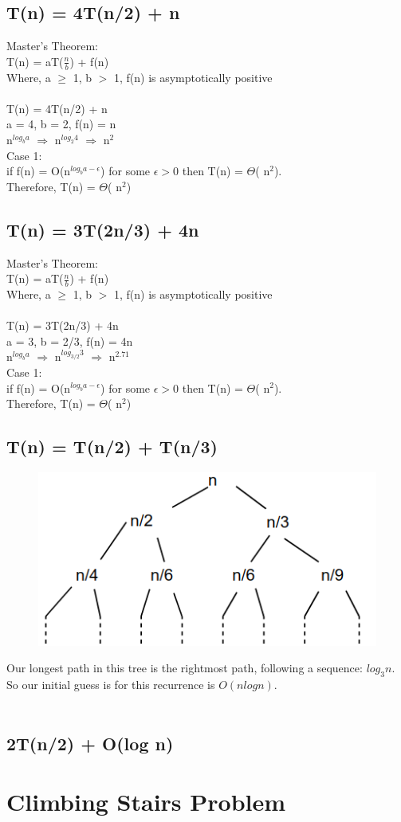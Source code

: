 \documentclass[10pt,letterpaper]{article}
\begin{document}
\subsection{T(n) = 4T(n/2) + n}
Master's Theorem:\\
T(n) = aT($\frac{n}{b}$) + f(n)\\
Where, a $\geq$ 1, b $>$ 1, f(n) is asymptotically positive\\
\\
T(n) = 4T(n/2) + n\\
a = 4, b = 2, f(n) = n\\
n$^{log_{b}a}$ $\Rightarrow$ n$^{log_{2}4}$ $\Rightarrow$ n$^{2}$\\
Case 1:\\
if f(n) = O(n$^{log_{b}a - \epsilon}$) for some $\epsilon > 0$ then T(n) = $\Theta$( n$^{2}$).\\
Therefore, T(n) =  $\Theta$( n$^{2}$)

\subsection{T(n) = 3T(2n/3) + 4n}
Master's Theorem:\\
T(n) = aT($\frac{n}{b}$) + f(n)\\
Where, a $\geq$ 1, b $>$ 1, f(n) is asymptotically positive\\
\\
T(n) = 3T(2n/3) + 4n\\
a = 3, b = 2/3, f(n) = 4n\\
n$^{log_{b}a}$ $\Rightarrow$ n$^{log_{3/2}3}$ $\Rightarrow$ n$^{2.71}$\\
Case 1:\\
if f(n) = O(n$^{log_{b}a - \epsilon}$) for some $\epsilon > 0$ then T(n) = $\Theta$( n$^{2}$).\\
Therefore, T(n) =  $\Theta$( n$^{2}$)

\subsection{T(n) = T(n/2) + T(n/3)}

\begin{figure}[h]
	\includegraphics[scale = .25]{recurtree1hw5.png}
\end{figure}
\noindent Our longest path in this tree is the rightmost path, following a sequence: $log_{3}n$. So our initial guess is for this recurrence is $O(nlogn)$.\\
\\


\subsection{2T(n/2) + O(log n)}


\section{Climbing Stairs Problem}
\end{document}
